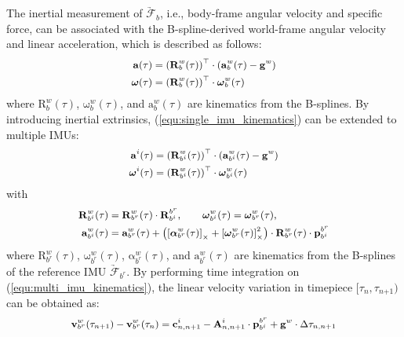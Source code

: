 \documentclass[lettersize,journal,twoside]{IEEEtran}
\newcommand\liehat[1]{\left[ #1 \right]_\times}
\newcommand\bsm[1]{\boldsymbol{\mathrm{#1}}}
\newcommand\rotation[2]{{\bsm{R}_{#1}^{#2}}}
\newcommand\angvel[2]{{\bsm{\omega}_{#1}^{#2}}}
\newcommand\angacce[2]{{\bsm{\alpha}_{#1}^{#2}}}
\newcommand\translation[2]{{\bsm{p}_{#1}^{#2}}}
\newcommand\linvel[2]{{\bsm{v}_{#1}^{#2}}}
\newcommand\linacce[2]{{\bsm{a}_{#1}^{#2}}}
\newcommand\gravity[1]{{\bsm{g}^{#1}}}
\newcommand\smallplus{{\text{+}}}
\newcommand\coordframe[1]{\underrightarrow{\mathcal{F}}_{#1}}
\begin{document}
The inertial measurement of $\coordframe{b}$, i.e., body-frame angular velocity and specific force, can be associated with the B-spline-derived world-frame angular velocity and linear acceleration, which is described as follows:
\begin{equation}
\small
\label{equ:single_imu_kinematics}
\begin{aligned}
\bsm{a}(\tau)&=\left(\rotation{b}{w}(\tau) \right) ^\top\cdot\left(\linacce{b}{w}(\tau)-\gravity{w}\right) 
\\
\bsm{\omega}(\tau)&=\left(\rotation{b}{w}(\tau) \right) ^\top\cdot\angvel{b}{w}(\tau)
\end{aligned}
\end{equation}
where $\rotation{b}{w}(\tau)$, $\angvel{b}{w}(\tau)$, and $\linacce{b}{w}(\tau)$ are kinematics from the B-splines.
By introducing inertial extrinsics, (\ref{equ:single_imu_kinematics}) can be extended to multiple IMUs:
\begin{equation}
\small
\label{equ:multi_imu_kinematics}
\begin{aligned}
\bsm{a}^i(\tau)&=\left(\rotation{b^i}{w}(\tau) \right) ^\top\cdot\left(\linacce{b^i}{w}(\tau)-\gravity{w}\right) 
\\
\bsm{\omega}^i(\tau)&=\left(\rotation{b^i}{w}(\tau) \right) ^\top\cdot\angvel{b^i}{w}(\tau)
\end{aligned}
\end{equation}
with
\begin{equation}
\small
\begin{aligned}
\rotation{b^i}{w}(\tau)&=\rotation{b^r}{w}(\tau)\cdot\rotation{b^i}{b^r},
\qquad
\angvel{b^i}{w}(\tau)=\angvel{b^r}{w}(\tau),
\\
\linacce{b^i}{w}(\tau)&=
\linacce{b^r}{w}(\tau)
+\left( \liehat{\angacce{b^r}{w}(\tau)}+\liehat{\angvel{b^r}{w}(\tau)}^2
\right) 
\cdot\rotation{b^r}{w}(\tau)\cdot\translation{b^i}{b^r}
\end{aligned}
\end{equation}
where $\rotation{b^r}{w}(\tau)$, $\angvel{b^r}{w}(\tau)$, $\angacce{b^r}{w}(\tau)$, and $\linacce{b^r}{w}(\tau)$ are kinematics from the B-splines of the reference IMU $\coordframe{b^r}$.
By performing time integration on (\ref{equ:multi_imu_kinematics}), the linear velocity variation in timepiece $[\tau_n,\tau_{n\smallplus 1})$ can be obtained as:
\begin{equation}
\small
\label{equ:velocity_variation}
\begin{aligned}
\linvel{b^r}{w}(\tau_{n\smallplus 1})-\linvel{b^r}{w}(\tau_n)
=\bsm{c}^i_{n,n\smallplus 1}-\bsm{A}^i_{n,n\smallplus 1}
\cdot\translation{b^i}{b^r}+\gravity{w}\cdot\Delta\tau_{n,n\smallplus 1}
\end{aligned}
\end{equation}
\end{document}
